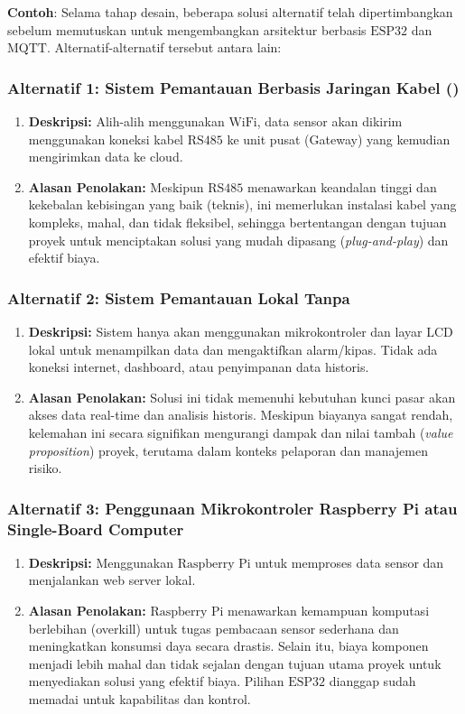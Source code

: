 \documentclass{elsinta}
\begin{document}
\textbf{Contoh}: Selama tahap desain, beberapa solusi alternatif telah dipertimbangkan sebelum memutuskan untuk mengembangkan arsitektur  berbasis $\text{ESP32}$ dan $\text{MQTT}$. Alternatif-alternatif tersebut antara lain:

\subsubsection*{Alternatif 1: Sistem Pemantauan Berbasis Jaringan Kabel ()}
\begin{enumerate}
    \item \textbf{Deskripsi:} Alih-alih menggunakan $\text{WiFi}$, data sensor akan dikirim menggunakan koneksi kabel $\text{RS485}$ ke unit pusat (Gateway) yang kemudian mengirimkan data ke cloud.
    \item \textbf{Alasan Penolakan:} Meskipun $\text{RS485}$ menawarkan keandalan tinggi dan kekebalan kebisingan yang baik (teknis), ini memerlukan instalasi kabel yang kompleks, mahal, dan tidak fleksibel, sehingga bertentangan dengan tujuan proyek untuk menciptakan solusi yang mudah dipasang (\textit{plug-and-play}) dan efektif biaya.
\end{enumerate}

\subsubsection*{Alternatif 2: Sistem Pemantauan Lokal Tanpa }
\begin{enumerate}
    \item \textbf{Deskripsi:} Sistem hanya akan menggunakan mikrokontroler dan layar $\text{LCD}$ lokal untuk menampilkan data dan mengaktifkan alarm/kipas. Tidak ada koneksi internet, dashboard, atau penyimpanan data historis.
    \item \textbf{Alasan Penolakan:} Solusi ini tidak memenuhi kebutuhan kunci pasar akan akses data real-time dan analisis historis. Meskipun biayanya sangat rendah, kelemahan ini secara signifikan mengurangi dampak dan nilai tambah (\textit{value proposition}) proyek, terutama dalam konteks pelaporan dan manajemen risiko.
\end{enumerate}

\subsubsection*{Alternatif 3: Penggunaan Mikrokontroler Raspberry Pi atau Single-Board Computer}
\begin{enumerate}
    \item \textbf{Deskripsi:} Menggunakan $\text{Raspberry Pi}$ untuk memproses data sensor dan menjalankan web server lokal.
    \item \textbf{Alasan Penolakan:} $\text{Raspberry Pi}$ menawarkan kemampuan komputasi berlebihan (overkill) untuk tugas pembacaan sensor sederhana dan meningkatkan konsumsi daya secara drastis. Selain itu, biaya komponen menjadi lebih mahal dan tidak sejalan dengan tujuan utama proyek untuk menyediakan solusi yang efektif biaya. Pilihan $\text{ESP32}$ dianggap sudah memadai untuk kapabilitas  dan kontrol.
\end{enumerate}
\end{document}
